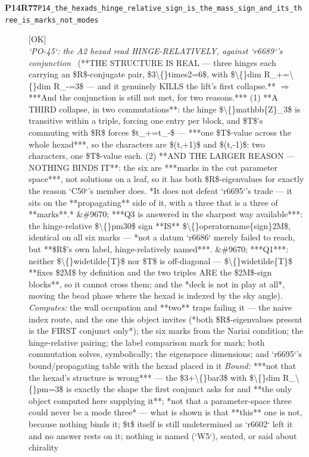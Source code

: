 \begin{description}
\item[\textbf{P14R77}\quad\texttt{P14\_the\_hexads\_hinge\_relative\_sign\_is\_the\_mass\_sign\_and\_its\_three\_is\_marks\_not\_modes}]\hfill\textsf{[OK]}\\
\textit{`PO-45`: the A2 hexad read HINGE-RELATIVELY, against `r6689`'s conjunction} \ (**THE STRUCTURE IS REAL --- three hinges each carrying an \$R\$-conjugate pair, \$3\textbackslash\{\}times2=6\$, with \$\textbackslash\{\}dim R\_+=\textbackslash\{\}dim R\_-=3\$ --- and it genuinely KILLS the lift's first collapse.** \ensuremath{\Rightarrow} ***And the conjunction is still not met, for two reasons.*** (1) **A THIRD collapse, in two commutations**: the hinge \$\textbackslash\{\}mathbb\{Z\}\_3\$ is transitive within a triple, forcing one entry per block, and \$T\$'s commuting with \$R\$ forces \$t\_+=t\_-\$ --- ***one \$T\$-value across the whole hexad***, so the characters are \$(t,+1)\$ and \$(t,-1)\$: two characters, one \$T\$-value each. (2)  **AND THE LARGER REASON --- NOTHING BINDS IT**: the six are ***marks in the cut parameter space***, not solutions on a leaf, so it has both \$R\$-eigenvalues for exactly the reason `C50`'s member does. *It does not defeat `r6695`'s trade --- it sits on the **propagating** side of it, with a three that is a three of **marks**.* \&\#9670;  ***Q3 is answered in the sharpest way available***: the hinge-relative \$\textbackslash\{\}pm30\$ sign **IS** \$\textbackslash\{\}operatorname\{sign\}2M\$, identical on all six marks --- *not a datum `r6686` merely failed to reach, but **\$R\$'s own label, hinge-relatively named***. \&\#9670; ***Q1***: neither \$\textbackslash\{\}widetilde\{T\}\$ nor \$T\$ is off-diagonal --- \$\textbackslash\{\}widetilde\{T\}\$ **fixes \$2M\$ by definition and the two triples ARE the \$2M\$-sign blocks**, so it cannot cross them; and the *deck is not in play at all*, moving the bead phase where the hexad is indexed by the sky angle). 
\emph{Computes:} the wall occupation and **two** traps failing it --- the naive index route, and the one this object invites (*both \$R\$-eigenvalues present is the FIRST conjunct only*); the six marks from the Nariai condition; the hinge-relative pairing; the label comparison mark for mark; both commutation solves, symbolically; the eigenspace dimensions; and `r6695`'s bound/propagating table with the hexad placed in it
 \emph{Bound:}  ***not that the hexad's structure is wrong*** --- the \$3+\textbackslash\{\}bar3\$ with \$\textbackslash\{\}dim R\_\textbackslash\{\}pm=3\$ is exactly the shape the first conjunct asks for and **the only object computed here supplying it**; *not that a parameter-space three could never be a mode three* --- what is shown is that **this** one is not, because nothing binds it; \$t\$ itself is still undetermined as `r6602` left it and no answer rests on it; nothing is named (`W5`), seated, or said about chirality

\end{description}
